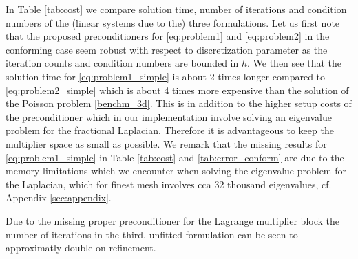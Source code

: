 In Table \ref{tab:cost} we compare solution time, number of iterations and
condition numbers of the (linear systems due to the) three formulations.
Let us first note that the proposed preconditioners for \eqref{eq:problem1} and
\eqref{eq:problem2} in the conforming case seem robust with respect to discretization
parameter as the iteration counts and condition numbers are bounded in $h$.
We then see that the solution time for \eqref{eq:problem1_simple} is about 2 times
longer compared to \eqref{eq:problem2_simple} which is about 4 times more expensive
than the solution of the Poisson problem \eqref{benchm_3d}. This is in addition to the
higher setup costs of the preconditioner which in our implementation involve solving
an eigenvalue problem for the fractional Laplacian. Therefore it is advantageous to keep
the multiplier space as small as possible. We remark that the missing
results for \eqref{eq:problem1_simple} in Table \ref{tab:cost} and \ref{tab:error_conform}
are due to the memory limitations which we encounter when solving the eigenvalue problem
for the Laplacian, which for finest mesh involves cca 32 thousand eigenvalues, cf. Appendix \ref{sec:appendix}.
%

Due to the missing proper preconditioner for the Lagrange multiplier block the
number of iterations in the third, unfitted formulation can be seen to approximatly
double on refinement. 

